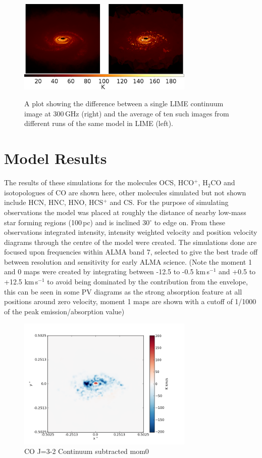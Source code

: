 \documentclass[useAMS,usenatbib]{mn2e}
\begin{document}
\begin{figure}
 \includegraphics[width=84mm]{Figures/sim/average_comparison.png}
 \label{averages}
 \caption{A plot showing the difference between a single LIME continuum image at 300$\,$GHz (right) and the average of ten such images from different runs of the same model in LIME (left).}
\end{figure}


\section{Model Results}

The results of these simulations for the molecules OCS, HCO$^+$, H$_2$CO and isotopologues of CO are shown here, other molecules simulated but not shown include HCN, HNC, HNO, HCS$^+$ and  CS.
For the purpose of simulating observations the model was placed at roughly the distance of nearby low-mass star forming regions (100$\,$pc) and is inclined 30$^\circ$ to edge on. From these observations integrated intensity, intensity weighted velocity and position velocity diagrams through the centre of the model were created.
The simulations done are focused upon frequencies within ALMA band 7, selected to give the best trade off between resolution and sensitivity for early ALMA science.
(Note the moment 1 and 0 maps were created by integrating between -12.5 to -0.5 km$\,$s$^{-1}$ and +0.5 to +12.5 km$\,$s$^{-1}$ to avoid being dominated by the contribution from the envelope, this can be seen in some PV diagrams as the strong absorption feature at all positions around zero velocity, moment 1 maps are shown with a cutoff of 1/1000 of the peak emission/absorption value)\newline

\begin{figure}[H]
 \includegraphics[width=84mm]{Figures/sim/imageCO_3-2_30deg_contSub.png}

 \caption{CO J=3-2 Continuum subtracted mom0}
\end{figure}
\end{document}
